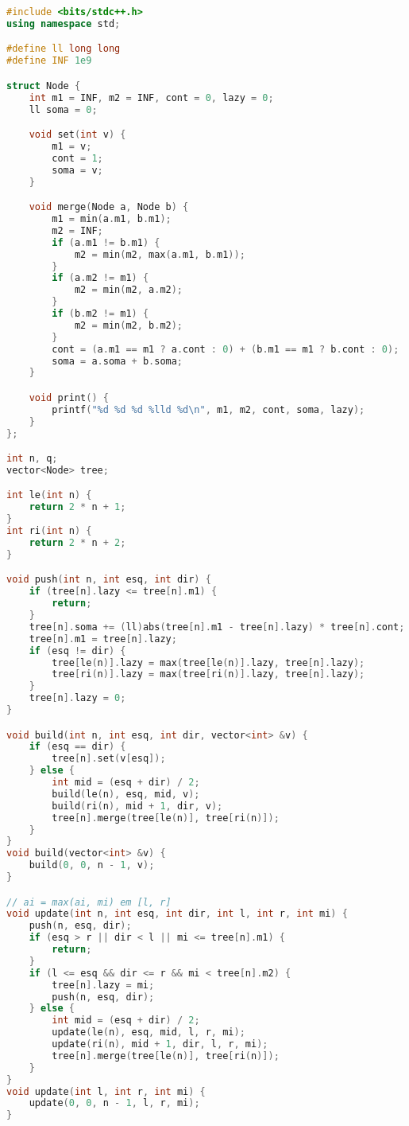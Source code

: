 \documentclass[11pt, a4paper, oneside]{book}
\begin{document}
\hfill

\begin{multicols}{2}
\begin{lstlisting}[language=C++]
#include <bits/stdc++.h>
using namespace std;

#define ll long long
#define INF 1e9

struct Node {
    int m1 = INF, m2 = INF, cont = 0, lazy = 0;
    ll soma = 0;

    void set(int v) {
        m1 = v;
        cont = 1;
        soma = v;
    }

    void merge(Node a, Node b) {
        m1 = min(a.m1, b.m1);
        m2 = INF;
        if (a.m1 != b.m1) {
            m2 = min(m2, max(a.m1, b.m1));
        }
        if (a.m2 != m1) {
            m2 = min(m2, a.m2);
        }
        if (b.m2 != m1) {
            m2 = min(m2, b.m2);
        }
        cont = (a.m1 == m1 ? a.cont : 0) + (b.m1 == m1 ? b.cont : 0);
        soma = a.soma + b.soma;
    }

    void print() {
        printf("%d %d %d %lld %d\n", m1, m2, cont, soma, lazy);
    }
};

int n, q;
vector<Node> tree;

int le(int n) {
    return 2 * n + 1;
}
int ri(int n) {
    return 2 * n + 2;
}

void push(int n, int esq, int dir) {
    if (tree[n].lazy <= tree[n].m1) {
        return;
    }
    tree[n].soma += (ll)abs(tree[n].m1 - tree[n].lazy) * tree[n].cont;
    tree[n].m1 = tree[n].lazy;
    if (esq != dir) {
        tree[le(n)].lazy = max(tree[le(n)].lazy, tree[n].lazy);
        tree[ri(n)].lazy = max(tree[ri(n)].lazy, tree[n].lazy);
    }
    tree[n].lazy = 0;
}

void build(int n, int esq, int dir, vector<int> &v) {
    if (esq == dir) {
        tree[n].set(v[esq]);
    } else {
        int mid = (esq + dir) / 2;
        build(le(n), esq, mid, v);
        build(ri(n), mid + 1, dir, v);
        tree[n].merge(tree[le(n)], tree[ri(n)]);
    }
}
void build(vector<int> &v) {
    build(0, 0, n - 1, v);
}

// ai = max(ai, mi) em [l, r]
void update(int n, int esq, int dir, int l, int r, int mi) {
    push(n, esq, dir);
    if (esq > r || dir < l || mi <= tree[n].m1) {
        return;
    }
    if (l <= esq && dir <= r && mi < tree[n].m2) {
        tree[n].lazy = mi;
        push(n, esq, dir);
    } else {
        int mid = (esq + dir) / 2;
        update(le(n), esq, mid, l, r, mi);
        update(ri(n), mid + 1, dir, l, r, mi);
        tree[n].merge(tree[le(n)], tree[ri(n)]);
    }
}
void update(int l, int r, int mi) {
    update(0, 0, n - 1, l, r, mi);
}


\end{lstlisting}
\end{multicols}
\end{document}
